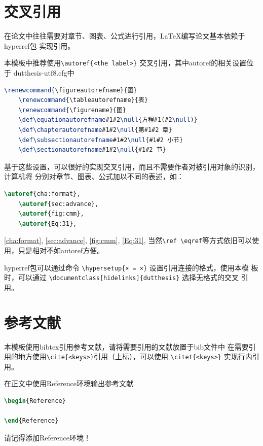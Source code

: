 \section{交叉引用}
\label{sec:cross-reference}
在论文中往往需要对章节、图表、公式进行引用，\LaTeX 编写论文基本依赖于hyperref包
实现引用。

本模板中推荐使用\verb|\autoref{<the label>}| 交叉引用，其中autoref的相关设置位于
dutthesis-utf8.cfg中
\begin{lstlisting}[language=TeX]
    \renewcommand{\figureautorefname}{图}
    \renewcommand{\tableautorefname}{表}
    \renewcommand{\figurename}{图}
    \def\equationautorefname#1#2\null{方程#1(#2\null)}
    \def\chapterautorefname#1#2\null{第#1#2 章}
    \def\subsectionautorefname#1#2\null{#1#2 小节}
    \def\sectionautorefname#1#2\null{#1#2 节}
\end{lstlisting}
基于这些设置，可以很好的实现交叉引用，而且不需要作者对被引用对象的识别，计算机将
分别对章节、图表、公式加以不同的表述，如：
\begin{lstlisting}[language=TeX]
    \autoref{cha:format},
    \autoref{sec:advance},
    \autoref{fig:cmm},
    \autoref{Eq:31},
\end{lstlisting}
\autoref{cha:format},
\autoref{sec:advance},
\autoref{fig:cmm},
\autoref{Eq:31},
当然\verb|\ref \eqref|等方式依旧可以使用，只是相对不如autoref方便。

hyperref包可以通过命令 \verb|\hypersetup{× = ×}| 设置引用连接的格式，使用本模
板时，可以通过 \verb|\documentclass[hidelinks]{dutthesis}| 选择无格式的交叉
引用。

\section{参考文献}
\label{sec:reference}
本模板使用bibtex引用参考文献，请将需要引用的文献放置于bib文件中
在需要引用的地方使用\verb|\cite{<keys>}|引用（上标），可以使用
\verb|\citet{<keys>}| 实现行内引用。

在正文中使用Reference环境输出参考文献
\begin{lstlisting}[language=TeX]
\begin{Reference}

\end{Reference}
\end{lstlisting}
请记得添加Reference环境！

